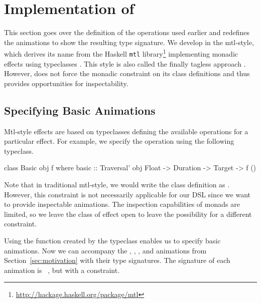 \section{Implementation of \dsl{}}
\label{sec:detail}

This section goes over the definition of the operations used earlier and redefines the animations to show the resulting type signature. We develop \dsl{} in the mtl-style, which derives its name from the Haskell \texttt{mtl} library\footnote{\url{http://hackage.haskell.org/package/mtl}} implementing monadic effects using typeclasses \cite{DBLP:conf/afp/Jones95}. This style is also called the finally tagless approach \cite{DBLP:journals/jfp/CaretteKS09}. However, \dsl{} does not force the monadic constraint on its class definitions and thus provides opportunities for inspectability.


\subsection{Specifying Basic Animations}

Mtl-style effects are based on typeclasses defining the available operations for a particular effect. For example, we specify the  operation using the following typeclass.

\begin{code}
class Basic obj f where
  basic :: Traversal' obj Float -> Duration -> Target -> f ()
\end{code}

Note that in traditional mtl-style, we would write the class definition as . However, this constraint is not necessarily applicable for our DSL since we want to provide inspectable animations. The inspection capabilities of monads are limited, so we leave the class of effect open to leave the possibility for a different constraint.

Using the  function created by the  typeclass enables us to specify basic animations. Now we can accompany the , , , and  animations from Section~\ref{sec:motivation} with their type signatures. The signature of each animation is ~\hs{()}, but with a  constraint.

